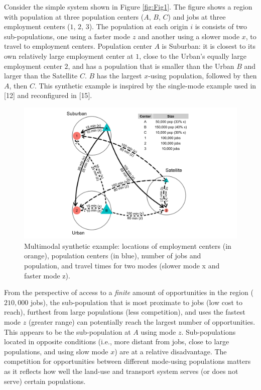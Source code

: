 \documentclass[10pt,letterpaper]{article}
\begin{document}
Consider the simple system shown in Figure \ref{fig:Fig1}. The figure
shows a region with population at three population centers (\(A\),
\(B\), \(C\)) and jobs at three employment centers (\(1\), \(2\),
\(3\)). The population at each origin \(i\) is consists of two
sub-populations, one using a faster mode \(z\) and another using a
slower mode \(x\), to travel to employment centers. Population center
\(A\) is Suburban: it is closest to its own relatively large employment
center at \(1\), close to the Urban's equally large employment center
\(2\), and has a population that is smaller than the Urban \(B\) and
larger than the Satellite \(C\). \(B\) has the largest \(x\)-using
population, followed by then \(A\), then \(C\). This synthetic example
is inspired by the single-mode example used in {[}12{]} and reconfigured
in {[}15{]}.

\begin{figure}

{\centering \includegraphics[width=0.85\linewidth]{images/Fig1} 

}

\caption{\label{fig:Fig1} Multimodal synthetic example: locations of employment centers (in orange), population centers (in blue), number of jobs and population, and travel times for two modes (slower mode x and faster mode z).}\label{fig:synthetic-example-plot}
\end{figure}

From the perspective of access to a \emph{finite} amount of
opportunities in the region (\(210,000\) jobs), the sub-population that
is most proximate to jobs (low cost to reach), furthest from large
populations (less competition), and uses the fastest mode \(z\) (greater
range) can potentially reach the largest number of opportunities. This
appears to be the sub-population at \(A\) using mode \(z\).
Sub-populations located in opposite conditions (i.e., more distant from
jobs, close to large populations, and using slow mode \(x\)) are at a
relative disadvantage. The competition for opportunities between
different mode-using populations matters as it reflects how well the
land-use and transport system serves (or does not serve) certain
populations.
\end{document}
